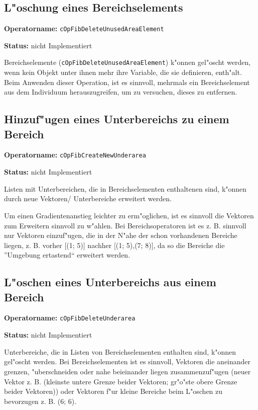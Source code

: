\subsection{L"oschung eines Bereichselements}

\bigskip\noindent
\textbf{Operatorname:} \verb|cOpFibDeleteUnusedAreaElement|

\bigskip\noindent
\textbf{Status:} nicht Implementiert

\bigskip\noindent
Bereichselemente (\verb|cOpFibDeleteUnusedAreaElement|) k"onnen gel"oscht werden, wenn kein Objekt unter ihnen mehr ihre Variable, die sie definieren, enth"alt. Beim Anwenden dieser Operation, ist es sinnvoll, mehrmals ein Bereichselement aus dem Individuum herauszugreifen, um zu versuchen, dieses zu entfernen.


\subsection{Hinzuf"ugen eines Unterbereichs zu einem Bereich}

\textbf{Operatorname:} \verb|cOpFibCreateNewUnderarea|

\bigskip\noindent
\textbf{Status:} nicht Implementiert

\bigskip\noindent
Listen mit Unterbereichen, die in Bereichselementen enthaltenen sind, k"onnen durch neue Vektoren/ Unterbereiche erweitert werden.

Um einen Gradientenanstieg leichter zu erm"oglichen, ist es sinnvoll die Vektoren zum Erweitern sinnvoll zu w"ahlen. Bei Bereichsoperatoren ist es z. B. sinnvoll nur Vektoren einzuf"ugen, die in der N"ahe der schon vorhandenen Bereiche liegen, z. B. vorher $[$(1; 5)$]$ nachher $[$(1; 5),(7; 8)$]$, da so die Bereiche die ''Umgebung ertastend`` erweitert werden.


\subsection{L"oschen eines Unterbereichs aus einem Bereich}

\textbf{Operatorname:} \verb|cOpFibDeleteUnderarea|

\bigskip\noindent
\textbf{Status:} nicht Implementiert

\bigskip\noindent
Unterbereiche, die in Listen von Bereichselementen enthalten sind, k"onnen gel"oscht werden. Bei Bereichselementen ist es sinnvoll, Vektoren die aneinander grenzen, "uberschneiden oder nahe beieinander liegen zusammenzuf"ugen (neuer Vektor z. B. (kleinste untere Grenze beider Vektoren; gr"o"ste obere Grenze beider Vektoren)) oder Vektoren f"ur kleine Bereiche beim L"oschen zu bevorzugen z. B. (6; 6).



